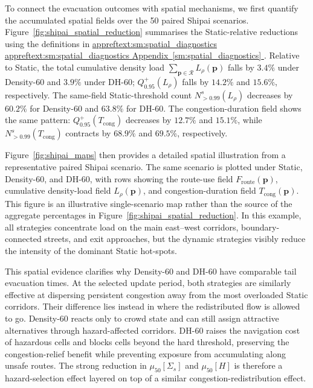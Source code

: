 \documentclass[preprint,12pt]{elsarticle}
\DeclareRobustCommand{\appref}[1]{%
  \hyperref[#1]{%
    \ifcsname appreftext:#1\endcsname%
      \csname appreftext:#1\endcsname%
    \else%
      Appendix~\ref*{#1}%
    \fi%
  }%
}
\begin{document}
To connect the evacuation outcomes with spatial mechanisms, we first
quantify the accumulated spatial fields over the 50 paired Shipai
scenarios. Figure~\ref{fig:shipai_spatial_reduction} summarises the
Static-relative reductions using the definitions in
\appref{sm:spatial_diagnostics}. Relative to
Static, the total cumulative density load
$\sum_{\mathbf{p}\in\mathcal{R}}L_{\rho}(\mathbf{p})$ falls by $3.4\%$
under Density-60 and $3.9\%$ under DH-60;
$Q^{+}_{0.95}(L_{\rho})$ falls by $14.2\%$ and $15.6\%$, respectively.
The same-field Static-threshold count $N^{s}_{>0.99}(L_{\rho})$ decreases
by $60.2\%$ for Density-60 and $63.8\%$ for DH-60. The
congestion-duration field shows the same pattern:
$Q^{+}_{0.95}(T_{\mathrm{cong}})$ decreases by $12.7\%$ and $15.1\%$,
while $N^{s}_{>0.99}(T_{\mathrm{cong}})$ contracts by $68.9\%$ and
$69.5\%$, respectively.

Figure~\ref{fig:shipai_maps} then provides a detailed spatial illustration
from a representative paired Shipai scenario. The same scenario is plotted
under Static, Density-60, and DH-60, with rows showing the route-use field
$F_{\mathrm{route}}(\mathbf{p})$, cumulative density-load field
$L_{\rho}(\mathbf{p})$, and congestion-duration field
$T_{\mathrm{cong}}(\mathbf{p})$. This figure is an illustrative
single-scenario map rather than the
source of the aggregate percentages in
Figure~\ref{fig:shipai_spatial_reduction}. In this example, all strategies
concentrate load on the main east--west corridors, boundary-connected
streets, and exit approaches, but the dynamic strategies visibly reduce the
intensity of the dominant Static hot-spots.

This spatial evidence clarifies why Density-60 and DH-60 have comparable
tail evacuation times. At the selected update period, both strategies
are similarly effective at dispersing persistent congestion away from
the most overloaded Static corridors. Their difference lies instead in
where the redistributed flow is allowed to go. Density-60 reacts only to
crowd state and can still assign attractive alternatives through
hazard-affected corridors. DH-60 raises the navigation cost of hazardous
cells and blocks cells beyond the hard threshold, preserving the
congestion-relief benefit while preventing exposure from accumulating
along unsafe routes. The strong reduction in $\mu_{50}[\Sigma_s]$ and
$\mu_{50}[H]$ is
therefore a hazard-selection effect layered on top of a similar
congestion-redistribution effect.
\end{document}
